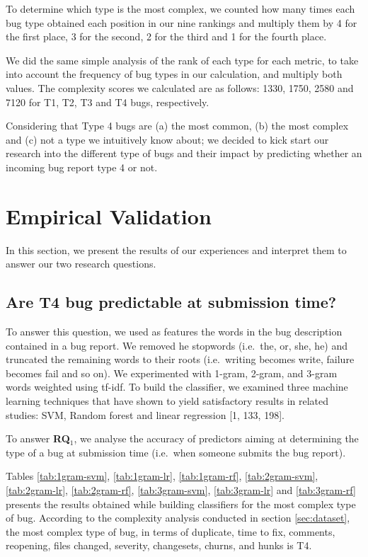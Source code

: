 \documentclass[12pt]{report}
\begin{document}
To determine which type is the most complex, we counted how many times
each bug type obtained each position in our nine rankings and multiply
them by 4 for the first place, 3 for the second, 2 for the third and 1
for the fourth place.

We did the same simple analysis of the rank of each type for each
metric, to take into account the frequency of bug types in our
calculation, and multiply both values. The complexity scores we
calculated are as follows: 1330, 1750, 2580 and 7120 for T1, T2, T3 and
T4 bugs, respectively.

Considering that Type 4 bugs are (a) the most common, (b) the most
complex and (c) not a type we intuitively know about; we decided to kick
start our research into the different type of bugs and their impact by
predicting whether an incoming bug report type 4 or not.

\section{Empirical Validation}\label{empirical-validation-4}

In this section, we present the results of our experiences and interpret
them to answer our two research questions.

\subsection{Are T4 bug predictable at submission
time?}\label{are-t4-bug-predictable-at-submission-time}

To answer this question, we used as features the words in the bug
description contained in a bug report. We removed he stopwords
(i.e.~the, or, she, he) and truncated the remaining words to their roots
(i.e.~writing becomes write, failure becomes fail and so on). We
experimented with 1-gram, 2-gram, and 3-gram words weighted using
tf-idf. To build the classifier, we examined three machine learning
techniques that have shown to yield satisfactory results in related
studies: SVM, Random forest and linear regression {[}1, 133, 198{]}.

To answer \textbf{RQ\(_1\)}, we analyse the accuracy of predictors
aiming at determining the type of a bug at submission time (i.e.~when
someone submits the bug report).

Tables \ref{tab:1gram-svm}, \ref{tab:1gram-lr}, \ref{tab:1gram-rf},
\ref{tab:2gram-svm}, \ref{tab:2gram-lr}, \ref{tab:2gram-rf},
\ref{tab:3gram-svm}, \ref{tab:3gram-lr} and \ref{tab:3gram-rf} presents
the results obtained while building classifiers for the most complex
type of bug. According to the complexity analysis conducted in section
\ref{sec:dataset}, the most complex type of bug, in terms of duplicate,
time to fix, comments, reopening, files changed, severity, changesets,
churns, and hunks is T4.
\end{document}
